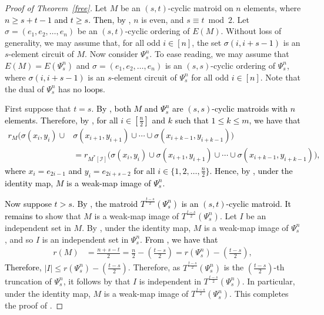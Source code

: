 \documentclass[11pt]{amsart}
\newcommand{\blue}{\textcolor{black}}
\newcommand{\bloo}{\textcolor{black}}
\begin{document}
\begin{proof}[Proof of Theorem~\ref{free}]
  Let $M$ be an $(s, t)$-cyclic matroid on $n$ elements, where \blue{$n \ge s+t-1$ and $t\ge s$.  Then, by ,} $n$ is even, and $s\equiv t\bmod{2}$.
Let $\sigma=(e_1, e_2, \ldots, e_n)$ be an $(s, t)$-cyclic ordering of $E(M)$. Without loss of generality, we may assume that, for all odd \bloo{$i\in[n]$}, the set \bloo{$\sigma(i, i+s-1)$} is an $s$-element circuit of $M$. Now consider $\Psi^n_s$. To ease reading, we may assume that $E(M)=E(\Psi^n_s)$ and $\sigma=(e_1, e_2, \ldots, e_n)$ is an $(s, s)$-cyclic ordering of $\Psi^n_s$, where \bloo{$\sigma(i, i+s-1)$} is an $s$-element circuit of $\Psi^n_s$ for all odd \bloo{$i\in[n]$}. Note that the dual of $\Psi^n_s$ has no \bloo{loops}.

First suppose that $t=s$. \blue{By , both $M$ and $\Psi^n_s$ are $(s, s)$-cyclic matroids with $n$ elements. Therefore, by , for all $i \in [\tfrac{n}{2}]$ and $k$ such that $1 \leq k \leq m$, we have that
\begin{align*}
r_M\big(\sigma(x_i, y_i)\cup & \sigma(x_{i+1}, y_{i+1})\cup \cdots\cup \sigma(x_{i+k-1}, y_{i+k-1})\big) \\
& = r_{M^*[\mathscr I]}\big(\sigma(x_i, y_i)\cup \sigma(x_{i+1}, y_{i+1})\cup \cdots\cup \sigma(x_{i+k-1}, y_{i+k-1})\big),
\end{align*}
where $x_i=e_{2i-1}$ and $y_i=e_{2i+s-2}$ for all $i\in \{1, 2, \ldots, \frac{n}{2}\}$. Hence, by , under the identity map, $M$ is a weak-map image of $\Psi^n_s$.}

\blue{Now suppose $t > s$. By , the matroid $T^{\frac{t-s}{2}}(\Psi^n_s)$ is an $(s,t)$-cyclic matroid. It remains to} show that $M$ is a weak-map image of $T^{\frac{t-s}{2}}(\Psi^n_s)$. Let $I$ be an independent set in $M$. By , under the identity map, $M$ is a weak-map image of $\Psi^n_s$, and so $I$ is an independent set in $\Psi^n_s$. \bloo{From , we have that}
\begin{align*}
r(M) & = {\textstyle \frac{n+s-t}{2}=\frac{n}{2}-\left(\frac{t-s}{2}\right)} = {\textstyle r(\Psi^n_s)-\left(\frac{t-s}{2}\right),}
\end{align*}
\bloo{Therefore,} $|I|\le r(\Psi^n_s)-\left(\frac{t-s}{2}\right)$. Therefore, as $T^{\frac{t-s}{2}}(\Psi^n_s)$ is the $\left(\frac{t-s}{2}\right)$-th truncation of $\Psi^n_s$, it follows by  that $I$ is independent in $T^{\frac{t-s}{2}}(\Psi^n_s)$. In particular, under the identity map, $M$ is a weak-map image of $T^{\frac{t-s}{2}}(\Psi^n_s)$. This completes the proof of .
\end{proof}
\end{document}
